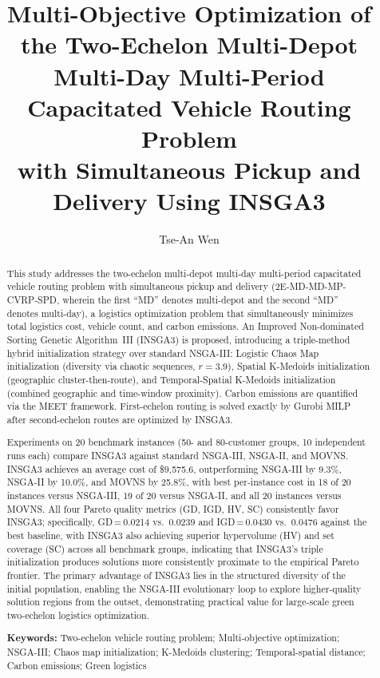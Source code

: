 \documentclass[11pt, a4paper]{article}
\title{\textbf{Multi-Objective Optimization of the Two-Echelon Multi-Depot\\
Multi-Day Multi-Period Capacitated Vehicle Routing Problem\\
with Simultaneous Pickup and Delivery Using INSGA3}}
\author{Tse-An Wen}
\date{}
\numberwithin{equation}{section}
\begin{document}
\maketitle
\thispagestyle{fancy}

\begin{abstract}
This study addresses the two-echelon multi-depot multi-day multi-period
capacitated vehicle routing problem with simultaneous pickup and delivery
(2E-MD-MD-MP-CVRP-SPD, wherein the first ``MD'' denotes multi-depot and the
second ``MD'' denotes multi-day), a logistics optimization problem that
simultaneously minimizes total logistics cost, vehicle count, and carbon
emissions.  An Improved Non-dominated Sorting Genetic Algorithm~III (INSGA3)
is proposed, introducing a triple-method hybrid initialization strategy over
standard NSGA-III: Logistic Chaos Map initialization (diversity via chaotic
sequences, $r=3.9$), Spatial K-Medoids initialization (geographic
cluster-then-route), and Temporal-Spatial K-Medoids initialization (combined
geographic and time-window proximity).  Carbon emissions are quantified via
the MEET framework.  First-echelon routing is solved exactly by Gurobi MILP
after second-echelon routes are optimized by INSGA3.

Experiments on 20 benchmark instances (50- and 80-customer groups, 10
independent runs each) compare INSGA3 against standard NSGA-III, NSGA-II,
and MOVNS\@.  INSGA3 achieves an average cost of \$9{,}575.6, outperforming
NSGA-III by 9.3\%, NSGA-II by 10.0\%, and MOVNS by 25.8\%, with best
per-instance cost in 18 of 20 instances versus NSGA-III, 19 of 20 versus
NSGA-II, and all 20 instances versus MOVNS\@.  All four Pareto quality metrics (GD, IGD, HV, SC) consistently favor
INSGA3; specifically, GD\,=\,0.0214 vs.\ 0.0239 and IGD\,=\,0.0430
vs.\ 0.0476 against the best baseline, with INSGA3 also achieving superior
hypervolume (HV) and set coverage (SC) across all benchmark groups,
indicating that INSGA3's triple initialization
produces solutions more consistently proximate to the empirical Pareto
frontier.  The primary advantage of INSGA3 lies in the structured diversity
of the initial population, enabling the NSGA-III evolutionary loop to explore
higher-quality solution regions from the outset, demonstrating practical value
for large-scale green two-echelon logistics optimization.

\medskip
\noindent\textbf{Keywords:} Two-echelon vehicle routing problem;
Multi-objective optimization; NSGA-III; Chaos map initialization;
K-Medoids clustering; Temporal-spatial distance; Carbon emissions;
Green logistics
\end{abstract}
\end{document}
